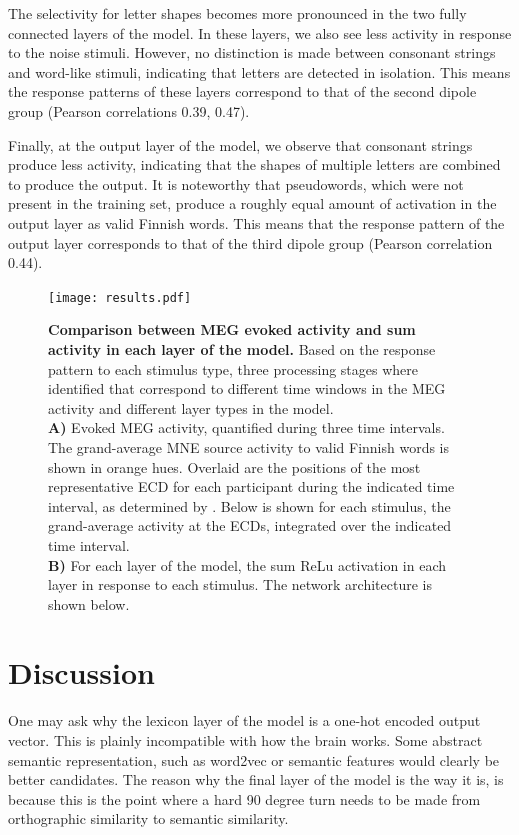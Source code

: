 \documentclass[a4paper, 10pt]{vanvliet_paper}
\begin{document}
The selectivity for letter shapes becomes more pronounced in the two fully connected layers of the model.
In these layers, we also see less activity in response to the noise stimuli.
However, no distinction is made between consonant strings and word-like stimuli, indicating that letters are detected in isolation.
This means the response patterns of these layers correspond to that of the second dipole group (Pearson correlations 0.39, 0.47).

Finally, at the output layer of the model, we observe that consonant strings produce less activity, indicating that the shapes of multiple letters are combined to produce the output.
It is noteworthy that pseudowords, which were not present in the training set, produce a roughly equal amount of activation in the output layer as valid Finnish words.
This means that the response pattern of the output layer corresponds to that of the third dipole group (Pearson correlation 0.44).

\begin{figure}
    \texttt{[image: results.pdf]}
    \vspace{2ex}
    \caption{
        \textbf{Comparison between \gls{MEG} evoked activity and sum activity in each layer of the model.}
        Based on the response pattern to each stimulus type, three processing stages where identified that correspond to different time windows in the \gls{MEG} activity and different layer types in the model.\\
        \textbf{A)} Evoked \gls{MEG} activity, quantified during three time intervals.
        The grand-average \gls{MNE} source activity to valid Finnish words is shown in orange hues.
        Overlaid are the positions of the most representative \gls{ECD} for each participant during the indicated time interval, as determined by \textcite{Vartiainen2011}.
        Below is shown for each stimulus, the grand-average activity at the \glspl{ECD}, integrated over the indicated time interval.\\
        \textbf{B)} For each layer of the model, the sum \gls{ReLu} activation in each layer in response to each stimulus.
        The network architecture is shown below.
    }\label{fig:results}
\end{figure}

\section{Discussion}
One may ask why the lexicon layer of the model is a one-hot encoded output vector.
This is plainly incompatible with how the brain works.
Some abstract semantic representation, such as word2vec or semantic features would clearly be better candidates.
The reason why the final layer of the model is the way it is, is because this is the point where a hard 90 degree turn needs to be made from orthographic similarity to semantic similarity.
\end{document}

